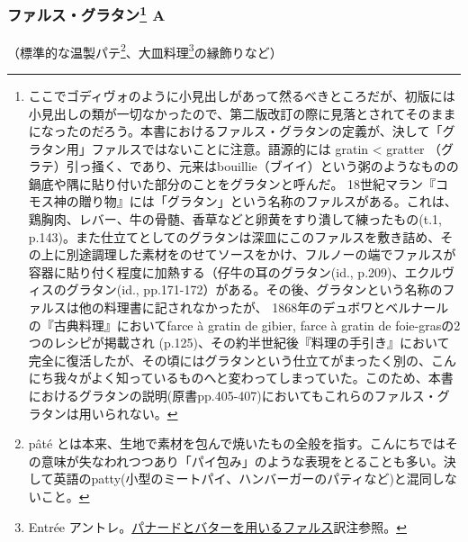 \begin{recette}

\hypertarget{farce-gratin-a}{%
\subsubsection[ファルス・グラタン
A]{\texorpdfstring{ファルス・グラタン\footnote{ここでゴディヴォのように小見出しがあって然るべきところだが、初版には小見出しの類が一切なかったので、第二版改訂の際に見落とされてそのままになったのだろう。本書におけるファルス・グラタンの定義が、決して「グラタン用」ファルスではないことに注意。語源的には
  gratin \textless{} gratter
  （グラテ）引っ掻く、であり、元来はbouillie（ブイイ）という粥のようなものの鍋底や隅に貼り付いた部分のことをグラタンと呼んだ。
  18世紀マラン『コモス神の贈り物』には「グラタン」という名称のファルスがある。これは、鶏胸肉、レバー、牛の骨髄、香草などと卵黄をすり潰して練ったもの(t.1,
  p.143)。また仕立てとしてのグラタンは深皿にこのファルスを敷き詰め、その上に別途調理した素材をのせてソースをかけ、フルノーの端でファルスが容器に貼り付く程度に加熱する（仔牛の耳のグラタン(id.,
  p.209)、エクルヴィスのグラタン(id.,
  pp.171-172）がある。その後、グラタンという名称のファルスは他の料理書に記されなかったが、
  1868年のデュボワとベルナールの『古典料理』においてfarce à gratin de
  gibier, farce à gratin de foie-grasの2つのレシピが掲載され
  (p.125)、その約半世紀後『料理の手引き』において完全に復活したが、その頃にはグラタンという仕立てがまったく別の、こんにち我々がよく知っているものへと変わってしまっていた。このため、本書におけるグラタンの説明(原書pp.405-407)においてもこれらのファルス・グラタンは用いられない。}
A}{ファルス・グラタン A}}\label{farce-gratin-a}}



（標準的な温製パテ\footnote{pâté
  とは本来、生地で素材を包んで焼いたもの全般を指す。こんにちではその意味が失なわれつつあり「パイ包み」のような表現をとることも多い。決して英語のpatty(小型のミートパイ、ハンバーガーのパティなど)と混同しないこと。}、大皿料理\footnote{Entrée
  アントレ。\protect\hyperlink{panade-a}{パナードとバターを用いるファルス}訳注参照。}の縁飾りなど）


\end{recette}

